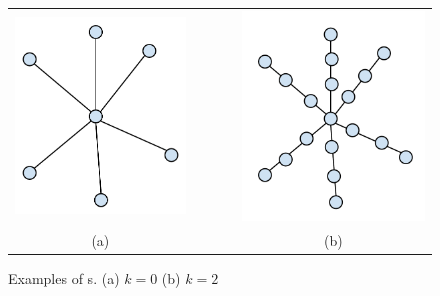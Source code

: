 \documentclass[MS]             %
              {iitmdiss_as}    %
\begin{document}
\begin{figure}[t]
  \centering
  \begin{tabular}[h]{ccccc}
    \includegraphics[scale=0.3]{../img/star.pdf} &&&&
    \includegraphics[scale=0.3]{../img/kstar.pdf}\\
    (a) &&&& (b)
  \end{tabular}
  \caption{\figtabsize Examples of {\kstar s}. (a) $k = 0$ (b) $k = 2$
  }
  \label{fig:ksubstar}
\end{figure}
\end{document}
